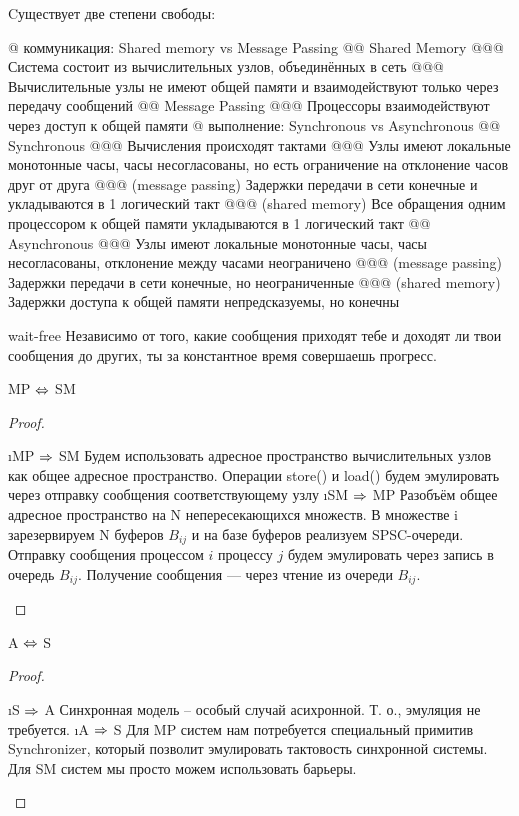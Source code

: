 Cуществует две степени свободы:
\begin{el}[ul]
@ коммуникация: Shared memory vs Message Passing
@@ Shared Memory
@@@ Система состоит из вычислительных узлов, объединённых в сеть
@@@ Вычислительные узлы не имеют общей памяти и взаимодействуют только через передачу сообщений
@@ Message Passing
@@@ Процессоры взаимодействуют через доступ к общей памяти
@ выполнение: Synchronous vs Asynchronous
@@ Synchronous
@@@ Вычисления происходят тактами
@@@ Узлы имеют локальные монотонные часы, часы несогласованы, но есть ограничение на отклонение часов друг от друга
@@@ (message passing) Задержки передачи в сети конечные и укладываются в 1 логический такт
@@@ (shared memory) Все обращения одним процессором к общей памяти укладываются в 1 логический такт
@@ Asynchronous
@@@ Узлы имеют локальные монотонные часы, часы несогласованы, отклонение между часами неограничено
@@@ (message passing) Задержки передачи в сети конечные, но неограниченные
@@@ (shared memory) Задержки доступа к общей памяти непредсказуемы, но конечны
\end{el}

wait-free
Независимо от того, какие сообщения приходят тебе и доходят ли твои сообщения до других, ты за константное время совершаешь прогресс.

\begin{stmt}
MP $\Leftrightarrow$ SM
\end{stmt}
\begin{proof}
\begin{itemize}
\i MP $\Rightarrow$ SM
Будем использовать адресное пространство вычислительных
узлов как общее адресное пространство.
Операции store() и load() будем эмулировать через отправку
сообщения соответствующему узлу
\i SM $\Rightarrow$ MP
Разобъём общее адресное пространство на N непересекающихся
множеств. В множестве i зарезервируем N буферов $B_{ij}$ и на базе буферов реализуем SPSC-очереди. Отправку сообщения процессом $i$ процессу $j$ будем эмулировать через запись в очередь $B_{ij}$. Получение сообщения --- через чтение из очереди $B_{ij}$.
\end{itemize}
\end{proof}

\begin{stmt}
A $\Leftrightarrow$ S
\end{stmt}
\begin{proof}
\begin{itemize}
\i S $\Rightarrow$ A
Синхронная модель – особый случай асихронной. Т. о., эмуляция не требуется.
\i A $\Rightarrow$ S
Для MP систем нам потребуется специальный примитив Synchronizer, который позволит эмулировать тактовость синхронной системы.
Для SM систем мы просто можем использовать барьеры.
\end{itemize}
\end{proof}

